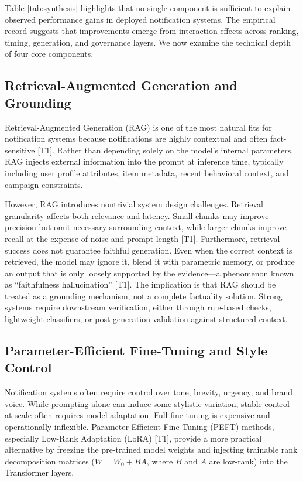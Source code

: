 \documentclass[sigconf]{acmart}
\begin{document}
Table \ref{tab:synthesis} highlights that no single component is sufficient to explain observed performance gains in deployed notification systems. The empirical record suggests that improvements emerge from interaction effects across ranking, timing, generation, and governance layers. We now examine the technical depth of four core components.

\subsection{Retrieval-Augmented Generation and Grounding}

Retrieval-Augmented Generation (RAG) is one of the most natural fits for notification systems because notifications are highly contextual and often fact-sensitive \cite{lewis2020retrieval} [T1]. Rather than depending solely on the model's internal parameters, RAG injects external information into the prompt at inference time, typically including user profile attributes, item metadata, recent behavioral context, and campaign constraints. 

However, RAG introduces nontrivial system design challenges. Retrieval granularity affects both relevance and latency. Small chunks may improve precision but omit necessary surrounding context, while larger chunks improve recall at the expense of noise and prompt length \cite{mixofgranularity2025} [T1]. Furthermore, retrieval success does not guarantee faithful generation. Even when the correct context is retrieved, the model may ignore it, blend it with parametric memory, or produce an output that is only loosely supported by the evidence---a phenomenon known as ``faithfulness hallucination'' \cite{benchmarking2025} [T1]. The implication is that RAG should be treated as a grounding mechanism, not a complete factuality solution. Strong systems require downstream verification, either through rule-based checks, lightweight classifiers, or post-generation validation against structured context.

\subsection{Parameter-Efficient Fine-Tuning and Style Control}

Notification systems often require control over tone, brevity, urgency, and brand voice. While prompting alone can induce some stylistic variation, stable control at scale often requires model adaptation. Full fine-tuning is expensive and operationally inflexible. Parameter-Efficient Fine-Tuning (PEFT) methods, especially Low-Rank Adaptation (LoRA) \cite{hu2022lora} [T1], provide a more practical alternative by freezing the pre-trained model weights and injecting trainable rank decomposition matrices ($W = W_0 + BA$, where $B$ and $A$ are low-rank) into the Transformer layers.
\end{document}
